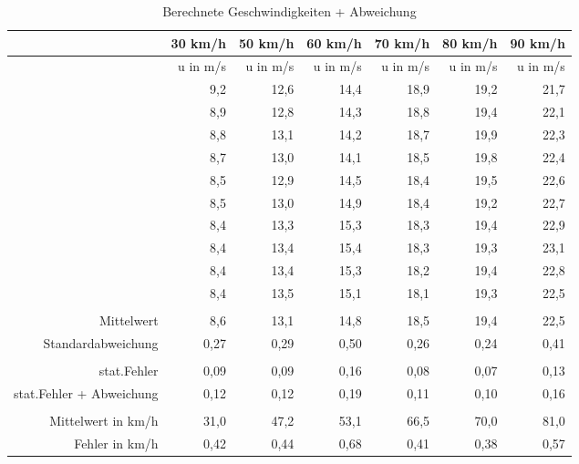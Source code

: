 \begin{table}[htbp]
  \centering
  \caption{Berechnete Geschwindigkeiten + Abweichung}
    \begin{tabular}{rrrrrrr}
    \toprule
          & 30 km/h & 50 km/h & 60 km/h & 70 km/h & 80 km/h & 90 km/h \\
    \midrule
          & u in m/s & u in m/s & u in m/s & u in m/s & u in m/s & u in m/s \\
          & 9,2   & 12,6  & 14,4  & 18,9  & 19,2  & 21,7 \\
          & 8,9   & 12,8  & 14,3  & 18,8  & 19,4  & 22,1 \\
          & 8,8   & 13,1  & 14,2  & 18,7  & 19,9  & 22,3 \\
          & 8,7   & 13,0    & 14,1  & 18,5  & 19,8  & 22,4 \\
          & 8,5   & 12,9  & 14,5  & 18,4  & 19,5  & 22,6 \\
          & 8,5   & 13,0    & 14,9  & 18,4  & 19,2  & 22,7 \\
          & 8,4   & 13,3  & 15,3  & 18,3  & 19,4  & 22,9 \\
          & 8,4   & 13,4  & 15,4  & 18,3  & 19,3  & 23,1 \\
          & 8,4   & 13,4  & 15,3  & 18,2  & 19,4  & 22,8 \\
          & 8,4   & 13,5  & 15,1  & 18,1  & 19,3  & 22,5 \\
          &       &       &       &       &       &  \\
    Mittelwert & 8,6  & 13,1  & 14,8 & 18,5 & 19,4 & 22,5 \\
    Standardabweichung & 0,27 & 0,29 & 0,50 & 0,26 & 0,24 & 0,41 \\
          &       &       &       &       &       &  \\
    stat.Fehler & 0,09 & 0,09 & 0,16 & 0,08 & 0,07 & 0,13 \\
    stat.Fehler + Abweichung & 0,12 & 0,12 & 0,19 & 0,11 & 0,10 & 0,16 \\
          &       &       &       &       &       &  \\
    Mittelwert in km/h & 31,0 & 47,2 & 53,1  & 66,5 & 70,0 & 81,0 \\
    Fehler in km/h & 0,42  & 0,44 & 0,68 & 0,41 & 0,38 & 0,57 \\
    \bottomrule
    \end{tabular}%
  \label{tab:Geschwindigkeiten}%
\end{table}%




